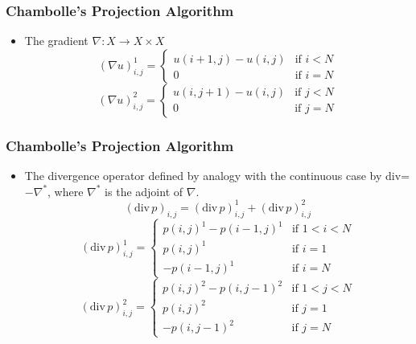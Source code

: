 \documentclass[notheorems,mathserif,table,compress]{beamer}  %
\begin{document}
%
\begin{frame}
\frametitle{Chambolle's Projection Algorithm} 
\begin{itemize}
\item The gradient $\nabla:X\rightarrow X\times X$
\begin{displaymath}
(\nabla u)_{i,j}^1=\left \{\begin{array}{ll}
u(i+1,j)-u(i,j) & \textrm{if $i<N$}\\
0 & \textrm{if $i=N$}
\end{array}\right.
\end{displaymath}
\begin{displaymath}
(\nabla u)_{i,j}^2=\left \{\begin{array}{ll}
u(i,j+1)-u(i,j) & \textrm{if $j<N$}\\
0 & \textrm{if $j=N$}
\end{array}\right.
\end{displaymath}

\end{itemize}
\end{frame}

\begin{frame}
\frametitle{Chambolle's Projection Algorithm} 
\begin{itemize}
\item The divergence operator defined by analogy with the continuous case by div=$−\nabla^*$, where $\nabla^*$ is the adjoint of $\nabla$. 
\begin{displaymath}
(\textrm{div}\,p)_{i,j}=(\textrm{div}\, p)_{i,j}^1+(\textrm{div}\, p)_{i,j}^2
\end{displaymath}
\begin{displaymath}
(\textrm{div}\, p)_{i,j}^1=\left \{\begin{array}{ll}
p(i,j)^1-p(i-1,j)^1 & \textrm{if $1<i<N$}\\
p(i,j)^1 & \textrm{if $i=1$}\\
-p(i-1,j)^1 & \textrm{if $i=N$}
\end{array}\right.
\end{displaymath}
\begin{displaymath}
(\textrm{div}\, p)_{i,j}^2=\left \{\begin{array}{ll}
p(i,j)^2-p(i,j-1)^2 & \textrm{if $1<j<N$}\\
p(i,j)^2 & \textrm{if $j=1$}\\
-p(i,j-1)^2 & \textrm{if $j=N$}
\end{array}\right.
\end{displaymath}

\end{itemize}
\end{frame}
\end{document}
